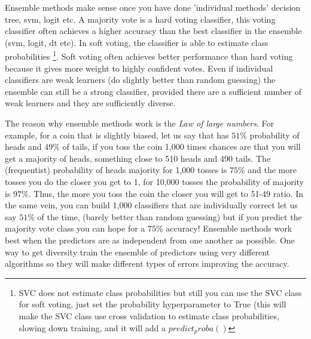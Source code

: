 \documentclass[11pt]{article}
\theoremstyle{definition}
\theoremstyle{remark}
\begin{document}
{Ensemble methods make sense once you have done 'individual methods' decision tree, svm, logit etc. A majority vote is a hard voting classifier, this voting classifier often achieves a higher accuracy than the best classifier in the ensemble (svm, logit, dt etc). In soft voting, the classifier is able to estimate class probabilities \footnote{SVC does not estimate class probabilities but still you can use the SVC class for soft voting, just set the probability hyperparameter to True (this will make the SVC class use cross validation to estimate class probabilities, slowing down training, and it will add a $predict_proba()$}. Soft voting often achieves better performance than hard voting because it gives more weight to highly confident votes.
Even if individual classifiers are weak learners (do slightly better than random guessing) the ensemble can still be a strong classifier, provided there are a sufficient number of weak learners and they are sufficiently diverse. %

The reason why ensemble methods work is the \emph{Law of large numbers}. For example, for a coin that is slightly biased, let us say that has $51\%$ probability of heads and $49\%$ of tails, if you toss the coin 1,000 times chances are that you will get a majority of heads, something close to 510 heads and 490 tails. The (frequentist) probability of heads majority for 1,000 tosses is $75\%$ and the more tosses you do the closer you get to 1, for 10,000 tosses the probability of majority is $97\%$. Thus, the more you toss the coin the closer you will get to 51-49 ratio. In the same vein, you can build 1,000 classifiers that are individually correct let us say $51\%$ of the time, (barely better than random guessing) but if you predict the majority vote class you can hope for a $75\%$ accuracy! Ensemble methods work best when the predictors are as independent from one another as possible. One way to get diversity train the ensemble of predictors  using very different algorithms so they will make different types of errors improving the accuracy.\cite{geron2017hands}

}
\end{document}
